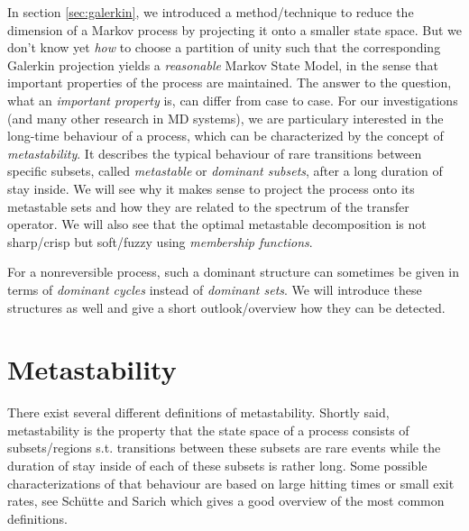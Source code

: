 In section \ref{sec:galerkin}, we introduced a method/technique to reduce the dimension of a Markov process by projecting it onto a smaller state space.
But we don't know yet \textit{how} to choose a partition of unity such that the corresponding Galerkin projection yields a \textit{reasonable} Markov State Model, in the sense that important properties of the process are maintained.
The answer to the question,  what an \textit{important property} is, can differ from case to case.
For our investigations (and many other research in MD systems), we are particulary interested in the long-time behaviour of a process, which can be characterized by the concept of \textit{metastability}.
It describes the typical behaviour of rare transitions between specific subsets, called \textit{metastable} or \textit{dominant subsets}, after a long duration of stay inside.
We will see why it makes sense to project the process onto its metastable sets and how they are related to the spectrum of the transfer operator.
We will also see that the optimal metastable decomposition is not sharp/crisp but soft/fuzzy using \textit{membership functions}.

For a nonreversible process, such a dominant structure can sometimes be given in terms of \textit{dominant cycles} instead of \textit{dominant sets}. We will introduce these structures as well and give a short outlook/overview how they can be detected.


\section{Metastability}
\label{sec:metastability}

There exist several different definitions of metastability. Shortly said, metastability is the property that the state space of a process
consists of subsets/regions s.t. transitions between these subsets are rare events while the duration of stay inside of each of these subsets is rather long.
Some possible characterizations of that behaviour are based on large hitting times or small exit rates, see Sch\"utte and Sarich\cite[chapter 3]{schutte2013metastability} which gives a good overview of the most common definitions.

